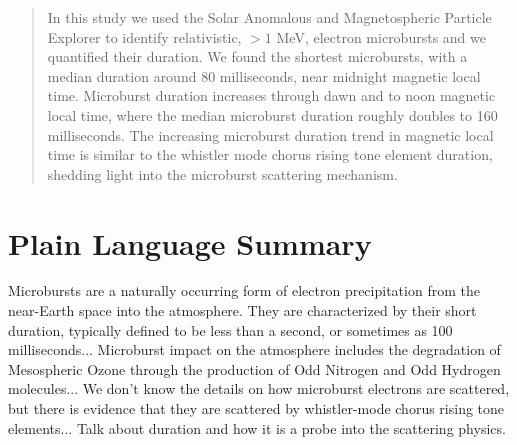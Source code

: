\documentclass[draft]{agujournal2019}
\begin{document}
%
%

%
%


\begin{abstract}
In this study we used the Solar Anomalous and Magnetospheric Particle Explorer to identify relativistic, $>1$ MeV, electron microbursts and we quantified their duration. We found the shortest microbursts, with a median duration around 80 milliseconds, near midnight magnetic local time. Microburst duration increases through dawn and to noon magnetic local time, where the median microburst duration roughly doubles to 160 milliseconds. The increasing microburst duration trend in magnetic local time is similar to the whistler mode chorus rising tone element duration, shedding light into the microburst scattering mechanism.
\end{abstract}

\section*{Plain Language Summary}
\noindent Microbursts are a naturally occurring form of electron precipitation from the near-Earth space into the atmosphere. They are characterized by their short duration, typically defined to be less than a second, or sometimes as 100 milliseconds... Microburst impact on the atmosphere includes the degradation of Mesospheric Ozone through the production of Odd Nitrogen and Odd Hydrogen molecules... We don't know the details on how microburst electrons are scattered, but there is evidence that they are scattered by whistler-mode chorus rising tone elements... Talk about duration and how it is a probe into the scattering physics.
\end{document}
